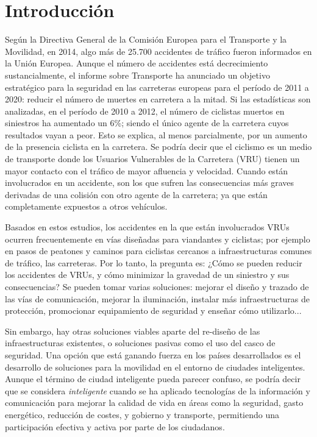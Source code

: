\chapter{Introducción}\label{cha:introduccion}
Según la Directiva General de la Comisión Europea para el Transporte y la Movilidad, en 2014, algo más de 25.700 accidentes de tráfico fueron informados en la Unión Europea. Aunque el número de accidentes está decrecimiento sustancialmente, el informe sobre Transporte ha anunciado un objetivo estratégico para la seguridad en las carreteras europeas para el período de 2011 a 2020: reducir el número de muertes en carretera a la mitad. Si las estadísticas son analizadas, en el período de 2010 a 2012, el número de ciclistas muertos en siniestros ha aumentado un 6\%; siendo el único agente de la carretera cuyos resultados vayan a peor. Esto se explica, al menos parcialmente, por un aumento de la presencia ciclista en la carretera. Se podría decir que el ciclismo es un medio de transporte donde los Usuarios Vulnerables de la Carretera (VRU) tienen un mayor contacto con el tráfico de mayor afluencia y velocidad. Cuando están involucrados en un accidente, son los que sufren las consecuencias más graves derivadas de una colisión con otro agente de la carretera; ya que están completamente expuestos a otros vehículos.

Basados en estos estudios, los accidentes en la que están involucrados VRUs ocurren frecuentemente en vías diseñadas para viandantes y ciclistas; por ejemplo en pasos de peatones y caminos para ciclistas cercanos a infraestructuras comunes de tráfico, las carreteras. Por lo tanto, la pregunta es: ¿Cómo se pueden reducir los accidentes de VRUs, y cómo minimizar la gravedad de un siniestro y sus consecuencias? Se pueden tomar varias soluciones: mejorar el diseño y trazado de las vías de comunicación, mejorar la iluminación, instalar más infraestructuras de protección, promocionar equipamiento de seguridad y enseñar cómo utilizarlo...

Sin embargo, hay otras soluciones viables aparte del re-diseño de las infraestructuras existentes, o soluciones pasivas como el uso del casco de seguridad. Una opción que está ganando fuerza en los países desarrollados es el desarrollo de soluciones para la movilidad en el entorno de ciudades inteligentes. Aunque el término de ciudad inteligente pueda parecer confuso, se podría decir que se considera \emph{inteligente} cuando se ha aplicado tecnologías de la información y comunicación para mejorar la calidad de vida en áreas como la seguridad, gasto energético, reducción de costes, y gobierno y transporte, permitiendo una participación efectiva y activa por parte de los ciudadanos.

